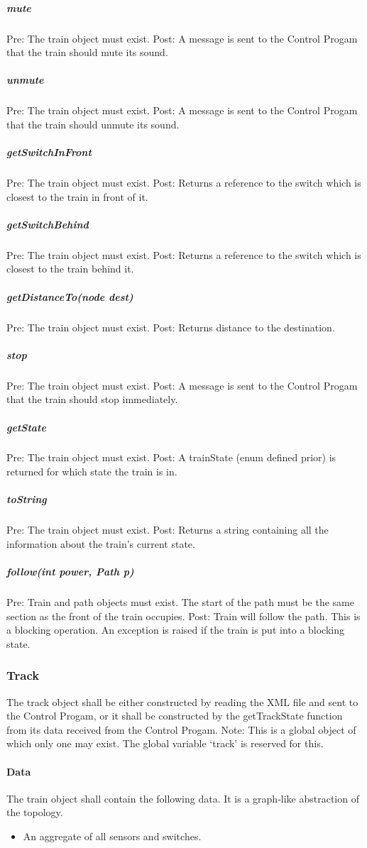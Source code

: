 \documentclass[a4paper,11pt,notitlepage]{article}
\def\CS{Control Progam\xspace}
\begin{document}
\subparagraph{mute} Pre: The train object must exist. Post: A message is sent to the \CS that the train should mute its sound.
\subparagraph{unmute} Pre: The train object must exist. Post: A message is sent to the \CS that the train should unmute its sound.
\subparagraph{getSwitchInFront} Pre: The train object must exist. Post: Returns a reference to the switch which is closest to the train in front of it.
\subparagraph{getSwitchBehind} Pre: The train object must exist. Post: Returns a reference to the switch which is closest to the train behind it.
\subparagraph{getDistanceTo(node dest)} Pre: The train object must exist. Post: Returns distance to the destination.
\subparagraph{stop} Pre: The train object must exist. Post: A message is sent to the \CS that the train should stop immediately.
\subparagraph{getState} Pre: The train object must exist. Post: A trainState (enum defined prior) is returned for which state the train is in.
\subparagraph{toString} Pre: The train object must exist. Post: Returns a string containing all the information about the train's current state.
\subparagraph{follow(int power, Path p)} Pre: Train and path objects must exist. The start of the path must be the same section as the front of the train occupies. Post: Train will follow the path. This is a blocking operation. An exception is raised if the train is put into a blocking state.

\subsubsection{Track}
The track object shall be either constructed by reading the XML file and sent to the \CS, or it shall be constructed by the getTrackState function from its data received from the \CS.
Note: This is a global object of which only one may exist. The global variable `track' is reserved for this.
\paragraph{Data}
The train object shall contain the following data. It is a graph-like abstraction of the topology.
\begin{itemize}
\item An aggregate of all sensors and switches.
\end{itemize}
\end{document}
